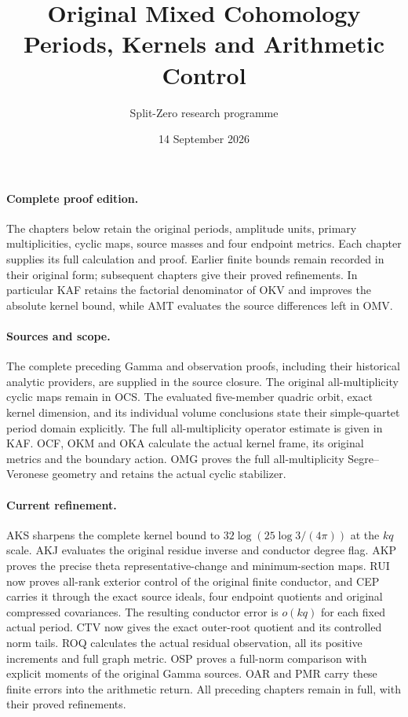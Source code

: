 \documentclass[11pt,a4paper]{article}
\title{Original Mixed Cohomology\\Periods, Kernels and Arithmetic Control}
\author{Split-Zero research programme}
\date{14 September 2026}
\begin{document}
\maketitle
\paragraph{Complete proof edition.}
The chapters below retain the original periods, amplitude units,
primary multiplicities, cyclic maps, source masses and four endpoint
metrics. Each chapter supplies its full calculation and proof. Earlier
finite bounds remain recorded in their original form; subsequent
chapters give their proved refinements. In particular KAF retains the
factorial denominator of OKV and improves the absolute kernel bound,
while AMT evaluates the source differences left in OMV.
\paragraph{Sources and scope.}
The complete preceding Gamma and observation proofs, including their
historical analytic providers, are supplied in the source closure.
The original all-multiplicity cyclic maps remain in OCS. The evaluated
five-member quadric orbit, exact kernel dimension, and its individual
volume conclusions state their simple-quartet period domain explicitly.
The full all-multiplicity operator estimate is given in KAF.
OCF, OKM and OKA calculate the actual kernel frame, its original
metrics and the boundary action. OMG proves the full all-multiplicity
Segre--Veronese geometry and retains the actual cyclic stabilizer.
\paragraph{Current refinement.}
AKS sharpens the complete kernel bound to
$32\log(25\log3/(4\pi))$ at the $kq$ scale. AKJ evaluates the
original residue inverse and conductor degree flag. AKP proves the
precise theta representative-change and minimum-section maps.
RUI now proves all-rank exterior control of the original finite
conductor, and CEP carries it through the exact source ideals,
four endpoint quotients and original compressed covariances.
The resulting conductor error is $o(kq)$ for each fixed actual period.
CTV now gives the exact outer-root quotient and its controlled
norm tails. ROQ calculates the actual residual observation, all its
positive increments and full graph metric. OSP proves a full-norm
comparison with explicit moments of the original Gamma sources.
OAR and PMR carry these finite errors into the arithmetic return.
All preceding chapters remain in full, with their proved refinements.
\tableofcontents
\clearpage
\end{document}
